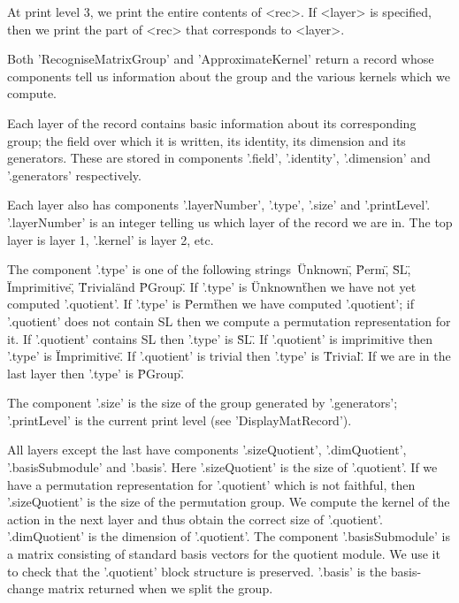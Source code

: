 At print level 3,  we print the entire contents  of <rec>. If  <layer> is
specified, then we print the part of <rec> that corresponds to <layer>.


Both 'RecogniseMatrixGroup' and 'ApproximateKernel' return a record whose
components tell  us information about the  group  and the various kernels
which we compute.

Each   layer  of   the record   contains  basic    information about  its
corresponding group; the field over   which it is written, its  identity,
its dimension   and its  generators.   These  are stored  in   components
'.field', '.identity', '.dimension' and '.generators' respectively.

Each layer  also has components   '.layer\-Number', '.type', '.size'  and
'.printLevel'.  '.layer\-Number' is an integer  telling us which layer of
the record we are in.  The top layer is layer  1,  '.kernel' is layer  2,
etc.

The  component  '.type' is  one  of the following strings\:\ \"Unknown\",
\"Perm\", \"SL\", \"Imprimitive\", \"Trivial\" and \"PGroup\". If '.type'
is \"Unknown\" then we have not  yet computed '.quotient'.  If '.type' is
\"Perm\"  then  we have   computed  '.quotient'; if '.quotient' does  not
contain SL  then  we compute a   permutation representation  for it.   If
'.quotient'  contains SL then  '.type'   is  \"SL\".  If '.quotient'   is
imprimitive then  '.type' is \"Imprimitive\".   If '.quotient' is trivial
then '.type' is \"Trivial\". If we are in  the last layer then '.type' is
\"PGroup\".

The  component    '.size' is  the   size  of   the   group  generated  by
'.generators';   '.printLevel'   is   the   current   print   level  (see
'DisplayMatRecord').

All  layers   except   the   last  have  components      '.sizeQuotient',
'.dimQuotient', '.basis\-Sub\-module' and '.basis'. Here  '.sizeQuotient'
is the size of '.quotient'.  If we  have a permutation representation for
'.quotient'  which is not faithful, then  '.sizeQuotient' is  the size of
the permutation group.   We compute the kernel of  the action in the next
layer and thus obtain the correct size of '.quotient'.  '.dimQuotient' is
the   dimension of '.quotient'.   The   component '.basisSubmodule' is  a
matrix consisting  of standard basis  vectors for the quotient module. We
use  it  to  check  that the '.quotient'   block  structure is preserved.
'.basis' is the basis-change matrix returned when we split the group.

